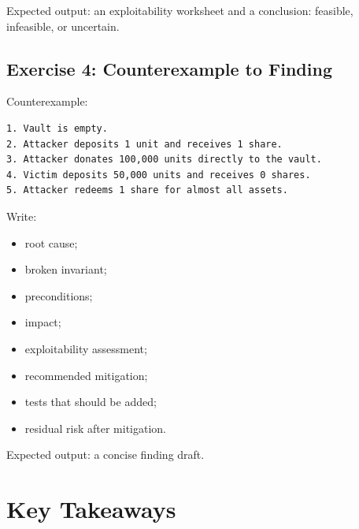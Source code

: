 Expected output: an exploitability worksheet and a conclusion: feasible, infeasible, or uncertain.

\subsection{Exercise 4: Counterexample to Finding}

Counterexample:

\begin{lstlisting}
1. Vault is empty.
2. Attacker deposits 1 unit and receives 1 share.
3. Attacker donates 100,000 units directly to the vault.
4. Victim deposits 50,000 units and receives 0 shares.
5. Attacker redeems 1 share for almost all assets.
\end{lstlisting}

Write:

\begin{itemize}
\tightlist
\item
  root cause;
\item
  broken invariant;
\item
  preconditions;
\item
  impact;
\item
  exploitability assessment;
\item
  recommended mitigation;
\item
  tests that should be added;
\item
  residual risk after mitigation.
\end{itemize}

Expected output: a concise finding draft.

\section{Key Takeaways}

